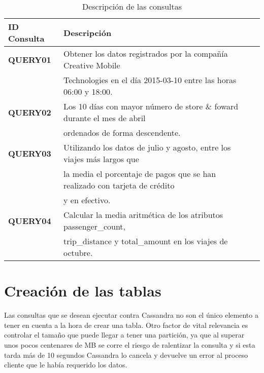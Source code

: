 \begin{table}[h!]
	\centering
	\begin{tabular}{|l|l|l|}
		
		\hline
		
		\textbf{ID Consulta} & \textbf{Descripción} \\
		
		\hline
		\hline
		
		\textbf{QUERY01} & Obtener los datos registrados por la compañía Creative Mobile \\ 
		                 & Technologies en el día 2015-03-10 entre las horas 06:00 y 18:00.\\
		
		\hline
		
		\textbf{QUERY02} & Los 10 días con mayor número de store \& foward durante el mes de abril \\ 
		                 & ordenados de forma descendente.\\ 
		
		\hline
		
		\textbf{QUERY03} & Utilizando los datos de julio y agosto, entre los viajes más largos que \\ 
		                 & la media el porcentaje de pagos que se han realizado con tarjeta de crédito \\
		                 & y en efectivo.\\
		
		\hline
		
		\textbf{QUERY04} & Calcular la media aritmética de los atributos passenger\_count,\\
		                 & trip\_distance y total\_amount en los viajes de octubre. \\
		
		\hline
		
	\end{tabular}
	\caption{Descripción de las consultas}
	\label{consultas_codigos}
\end{table}

\section{Creación de las tablas}

Las consultas que se desean ejecutar contra Cassandra no son el único elemento a tener en cuenta a la hora de crear una tabla. Otro factor de vital relevancia es controlar el tamaño que puede llegar a tener una partición, ya que al superar unos pocos centenares de MB se corre el riesgo de ralentizar la consulta y si esta tarda más de 10 segundos Cassandra lo cancela y devuelve un error al proceso cliente que le había requerido los datos.\\

